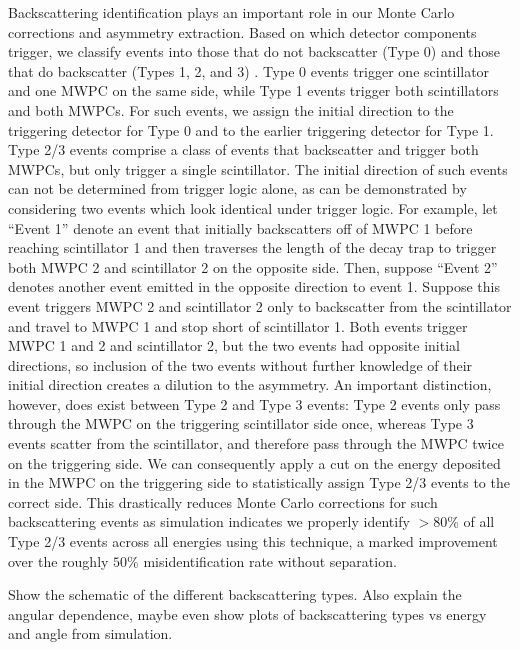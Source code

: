 Backscattering identification plays
an important role in our Monte Carlo corrections and asymmetry extraction.
Based on which detector components trigger, we classify events
into those that do not backscatter
(Type 0) and those that do backscatter (Types 1, 2, and 3) \cite{plaster12}. Type 0 events
trigger one scintillator and one MWPC on the same side, while Type 1 events trigger
both scintillators and both MWPCs. For such events, we assign the initial
direction to the triggering detector for Type 0 and to the earlier triggering detector
for Type 1. Type 2/3 events comprise a class of events that backscatter and trigger both
MWPCs, but only trigger a single scintillator.
The initial direction of such events can
not be determined from trigger logic alone, as can be demonstrated by considering two events
which look identical under trigger logic.
For example, let ``Event 1'' denote an event that initially backscatters off
of MWPC 1 before reaching scintillator 1
and then traverses the length of the decay
trap to trigger both MWPC 2 and scintillator 2 on the opposite side.
Then, suppose ``Event 2'' denotes another event emitted
in the opposite direction to event 1. Suppose this event
triggers MWPC 2 and scintillator 2
only to backscatter from the scintillator and travel to MWPC 1 and stop short
of scintillator 1. Both events trigger MWPC 1 and 2 and scintillator 2,
but the two events had opposite initial directions, so inclusion of the
two events without further knowledge of their initial direction creates
a dilution to the asymmetry.
An important distinction, however, does exist between Type 2 and Type 3 events:
Type 2 events only pass through the MWPC on the
triggering scintillator side once, whereas Type 3 events scatter from
the scintillator, and therefore pass through the MWPC twice on
the triggering side. We can consequently apply a cut on the energy deposited in
the MWPC on the triggering side to statistically assign
Type 2/3 events to the correct side.
This drastically reduces
Monte Carlo corrections for such backscattering events as simulation indicates we
properly identify $>80\%$ of all Type 2/3 events across all energies using this
technique, a marked
improvement over the roughly $50\%$ misidentification rate without separation.

Show the schematic of the different backscattering types. Also explain the 
angular dependence, maybe even show plots of backscattering types vs energy 
and angle from simulation.

